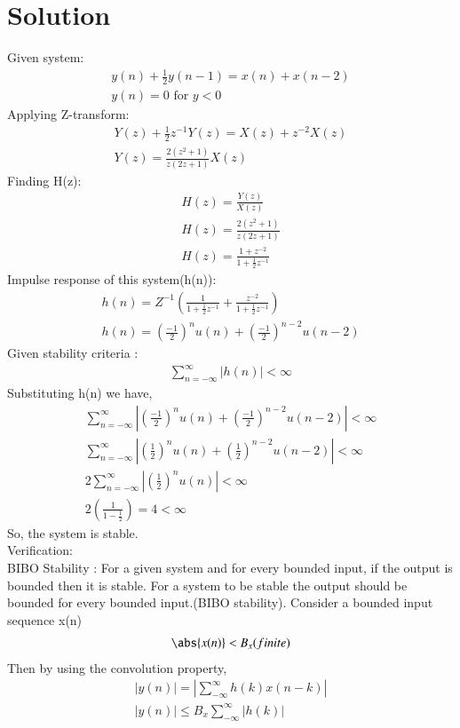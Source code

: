 \documentclass[journal,12pt,twocolumn]{IEEEtran}
\begin{document}
\section{Solution}
Given system: 
\begin{align}
\label{eq:system}
y(n)+\frac{1}{2}y(n-1) = x(n)+x(n-2) \\
y(n)=0 \text{ for }y<0
\end{align}
Applying Z-transform:
\begin{align}
Y(z) + \frac{1}{2}z^{-1}Y(z)=X(z) + z^{-2}X(z)\\
Y(z)=\frac{2(z^2+1)}{z(2z+1)}X(z)
\end{align}
Finding H(z):
\begin{align}
H(z) = \frac{Y(z)}{X(z)}\\
H(z) = \frac{2(z^2+1)}{z(2z+1)} \\
H(z) = \frac{1+z^{-2}}{1+\frac{1}{2}z^{-1}}
\end{align}
Impulse response of this system(h(n)):
\begin{align}
    h(n)= Z^{-1}(\frac{1}{1+\frac{1}{2}z^{-1}} + \frac{z^{-2}}{1+\frac{1}{2}z^{-1}})\\
    h(n)=(\frac{-1}{2})^nu(n) + (\frac{-1}{2})^{n-2}u(n-2)
\end{align}
Given stability criteria :
\begin{align}
\sum_{n=-\infty}^{\infty}{|h(n)|} < \infty
\end{align}
Substituting h(n) we have,
\begin{align}
\sum_{n=-\infty}^{\infty}{|(\frac{-1}{2})^nu(n) + (\frac{-1}{2})^{n-2}u(n-2)|} < \infty \\
\sum_{n=-\infty}^{\infty}{|(\frac{1}{2})^nu(n) + (\frac{1}{2})^{n-2}u(n-2)|} < \infty \\
2\sum_{n=-\infty}^{\infty}{|(\frac{1}{2})^nu(n)|} < \infty \\
2(\frac{1}{1-\frac{1}{2}}) = 4 < \infty
\end{align}
So, the system is stable.\\
Verification:\\
BIBO Stability : For a given system and for every bounded input, if the output is bounded then it is stable. 
For a system to be stable the output should be bounded for every bounded input.(BIBO stability).
Consider a bounded input sequence x(n) 
\begin{align}
\abs{x(n)}<B_x(finite)
\end{align}
Then by using the convolution property,
\begin{align}
 |y(n)|= |\sum_{-\infty}^{\infty}h(k)x(n-k)|\\
 |y(n)| \leq B_x\sum_{-\infty}^{\infty}|h(k)|
 \end{align}
\end{document}

